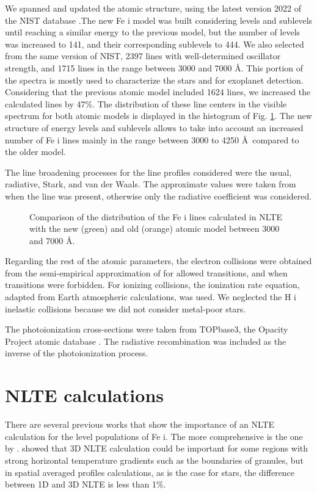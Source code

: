 \documentclass[baaa]{baaa}
\begin{document}
We spanned and updated the atomic structure, using the latest version 2022 of the NIST database \citep{nist22}.The new Fe {\sc i} model was built considering levels and sublevels until reaching a similar energy to the previous model, but the number of levels was increased to 141, and their corresponding sublevels to 444. 
We also selected from the same version of NIST, 2397 lines with well-determined oscillator strength, and 1715 lines in the range between 3000 and 7000 \AA. This portion of the spectra is mostly used to characterize the stars and for exoplanet detection. Considering that the previous atomic model included 1624 lines, we increased the calculated lines by 47\%. The distribution of these line centers in the visible spectrum for both atomic models is displayed in the histogram of Fig. \ref{fig:histogram}. The new structure of energy levels and sublevels allows to take into account an increased number of Fe {\sc i} lines mainly in the range between 3000 to 4250 \AA ~compared to the older model.

The line broadening processes for the line profiles considered were the usual, radiative, Stark, and van der Waals. The approximate values were taken from \cite{kurucz:1995} when the line was present, otherwise only the radiative coefficient was considered. 

\begin{figure}[t]
\centering
{}
\caption{Comparison of the distribution of the Fe {\sc i} lines calculated in NLTE with the new (green) and old (orange) atomic model between 3000 and 7000 \AA.}
\label{fig:histogram}
\end{figure}

Regarding the rest of the atomic parameters, the electron collisions were obtained from the semi-empirical approximation of \cite{sea62} for allowed transitions, and \cite{vanRege62}
when transitions were forbidden. For ionizing collisions,
the \cite{nrl05} ionization rate equation, adapted from Earth atmospheric calculations, was used. We neglected the H {\sc i} inelastic collisions because we did not consider metal-poor stars.

The photoionization cross-sections were taken from TOPbase3,
the Opacity Project atomic database \citep{topbase93}. 
The radiative recombination was included as the
inverse of the photoionization process.  

\section{NLTE calculations}
There are several previous works that show the importance of an NLTE calculation for the level populations of Fe {\sc i}. The more comprehensive is the one by \cite{masho11}. \cite{hol13} showed that 3D NLTE calculation could be important for some regions with strong horizontal temperature gradients such as the boundaries of granules, but in spatial averaged profiles calculations, as is the case for stars, the difference between 1D and 3D NLTE is less than 1\%.
\end{document}
